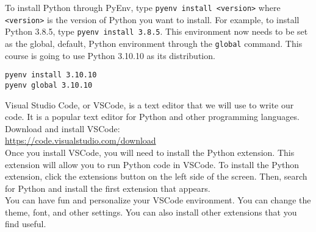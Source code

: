 \documentclass{homework}
\begin{document}
\begin{problem}
To install Python through PyEnv, type \texttt{pyenv install <version>} where \texttt{<version>} is the version of Python you want to install. For example, to install Python 3.8.5, type \texttt{pyenv install 3.8.5}. This environment now needs to be set as the global, default, Python environment through the \texttt{global} command. This course is going to use Python 3.10.10 as its distribution.\\

\begin{lstlisting}
pyenv install 3.10.10
pyenv global 3.10.10
\end{lstlisting}

\end{problem}

\begin{problem}

Visual Studio Code, or VSCode, is a text editor that we will use to write our code. It is a popular text editor for Python and other programming languages. Download and install VSCode:\\

\url{https://code.visualstudio.com/download}\\

Once you install VSCode, you will need to install the Python extension. This extension will allow you to run Python code in VSCode. To install the Python extension, click the extensions button on the left side of the screen. Then, search for Python and install the first extension that appears.\\

You can have fun and personalize your VSCode environment. You can change the theme, font, and other settings. You can also install other extensions that you find useful.\\

\end{problem}
\end{document}

